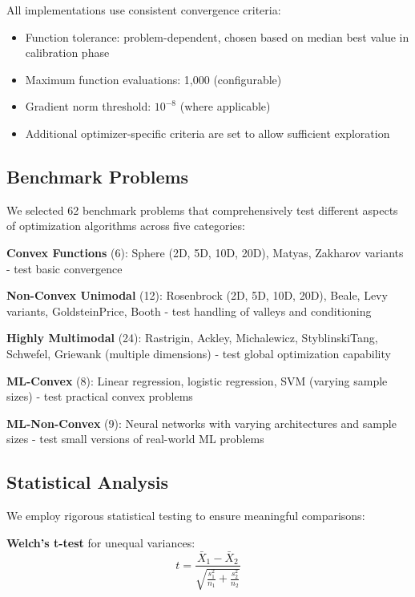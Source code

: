 All implementations use consistent convergence criteria:

\begin{itemize}
\tightlist
\item
  Function tolerance: problem-dependent, chosen based on median best value in calibration phase
\item
  Maximum function evaluations: 1,000 (configurable)
\item
  Gradient norm threshold: \(10^{-8}\) (where applicable)
\item
  Additional optimizer-specific criteria are set to allow sufficient exploration
\end{itemize}

\hypertarget{benchmark-problems}{%
\subsection{Benchmark Problems}\label{benchmark-problems}}

We selected 62 benchmark problems that comprehensively test different aspects of optimization algorithms across five categories:

\textbf{Convex Functions} (6): Sphere (2D, 5D, 10D, 20D), Matyas, Zakharov variants - test basic convergence

\textbf{Non-Convex Unimodal} (12): Rosenbrock (2D, 5D, 10D, 20D), Beale, Levy variants, GoldsteinPrice, Booth - test handling of valleys and conditioning

\textbf{Highly Multimodal} (24): Rastrigin, Ackley, Michalewicz, StyblinskiTang, Schwefel, Griewank (multiple dimensions) - test global optimization capability

\textbf{ML-Convex} (8): Linear regression, logistic regression, SVM (varying sample sizes) - test practical convex problems

\textbf{ML-Non-Convex} (9): Neural networks with varying architectures and sample sizes - test small versions of real-world ML problems

\hypertarget{statistical-analysis}{%
\subsection{Statistical Analysis}\label{statistical-analysis}}

We employ rigorous statistical testing to ensure meaningful comparisons:

\textbf{Welch's t-test} for unequal variances:
\[t = \frac{\bar{X}_1 - \bar{X}_2}{\sqrt{\frac{s_1^2}{n_1} + \frac{s_2^2}{n_2}}}\]

